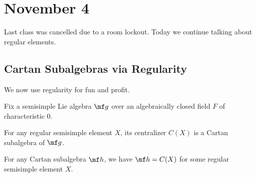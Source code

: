 \documentclass[../notes.tex]{subfiles}
\begin{document}
\section{November 4}
Last class was cancelled due to a room lockout. Today we continue talking about regular elements.

\subsection{Cartan Subalgebras via Regularity}
We now use regularity for fun and profit.
\begin{proposition}
	Fix a semisimple Lie algebra $\mf g$ over an algebraically closed field $F$ of characteristic $0$.
	\begin{listalph}
		\item For any regular semisimple element $X$, its centralizer $C(X)$ is a Cartan subalgebra of $\mf g$.
		\item For any Cartan subalgebra $\mf h$, we have $\mf h=C(X)$ for some regular semisimple element $X$.
	\end{listalph}
\end{proposition}
\end{document}
